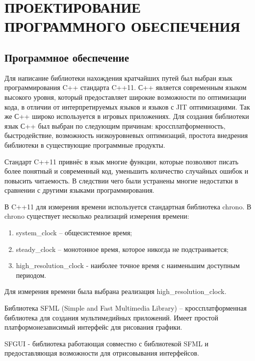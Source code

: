 \section[Проектирование программного обеспечения]{\MakeTextUppercase{ПРОЕКТИРОВАНИЕ ПРОГРАММНОГО ОБЕСПЕЧЕНИЯ}}
\vspace{-1\baselineskip} 
\subsection{Программное обеспечение}

Для написание библиотеки нахождения кратчайших путей был выбран язык программирования C++ стандарта C++11. С++ является современным языком высокого уровня, который предоставляет широкие возможности по оптимизации кода, в отличии от интерпретируемых языков и языков с JIT оптимизациями. Так же С++ широко используется в игровых приложениях. Для создания библиотеки язык С++ был выбран по следующим причинам: кроссплатформенность, быстродействие, возможность низкоуровневых оптимизаций, простота внедрения библиотеки в существующие программные продукты. 

Стандарт C++11 привнёс в язык многие функции, которые позволяют писать более понятный и современный код, уменьшить количество случайных ошибок и повысить читаемость. В следствии чего были устранены многие недостатки в сравнении с другими языками программирования.

В C++11 для измерения времени используется стандартная библиотека chrono. В chrono существует несколько реализаций измерения времени:

\begin{enumerate}
    \item system\_clock -- общесистемное время;
    \item steady\_clock -- монотонное время, которое никогда не подстраивается;
    \item high\_resolution\_clock - наиболее точное время с наименьшим доступным периодом.  
\end{enumerate} 

Для измерения времени была выбрана реализация high\_resolution\_clock.

Библиотека SFML (Simple and Fast Multimedia Library) -- кроссплатформенная библиотека для создания мультимедийных приложений. Имеет простой платформонезависимый интерфейс для рисования графики.

SFGUI - библиотека работающая совместно с библиотекой SFML и предоставляющая возможности для отрисовывания интерфейсов.

